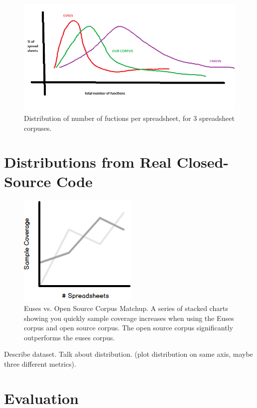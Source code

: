 \documentclass[conference]{IEEEtran}
\begin{document}
\begin{figure}[!t]
\centering
\includegraphics[width=\columnwidth]{functions.png}
\caption{Distribution of number of fuctions per spreadsheet, for 3 spreadsheet corpuses.}
\label{fig:functions}
\end{figure}

\section{Distributions from Real Closed-Source Code}

\begin{figure}[ht!]
\centering
\includegraphics[scale=0.6]{figures/eusesvos.png}
\caption{Euses vs. Open Source Corpus Matchup. A series of stacked charts showing you quickly sample coverage increases when using the Euses corpus and open source corpus. The open source corpus significantly outperforms the euses corpus.}
\label{overflow}
\end{figure}


Describe dataset.
Talk about distribution. (plot distribution on same axis, maybe three different metrics).

\section{Evaluation}
\end{document}
